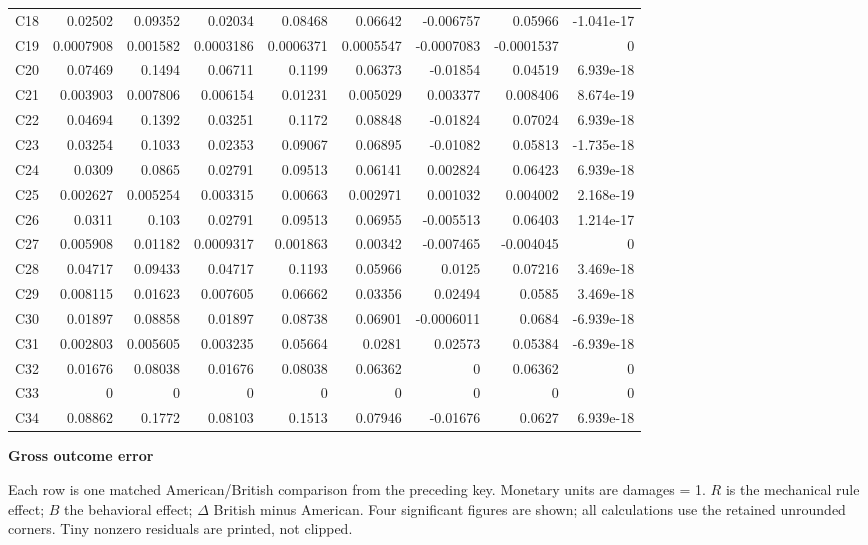\documentclass[10pt]{article}
\begin{document}
\begin{longtable}{@{}lrrrrrrrr@{}}
C18 & 0.02502 & 0.09352 & 0.02034 & 0.08468 & 0.06642 & -0.006757 & 0.05966 & -1.041e-17\\[1pt]
C19 & 0.0007908 & 0.001582 & 0.0003186 & 0.0006371 & 0.0005547 & -0.0007083 & -0.0001537 & 0\\[1pt]
C20 & 0.07469 & 0.1494 & 0.06711 & 0.1199 & 0.06373 & -0.01854 & 0.04519 & 6.939e-18\\[1pt]
C21 & 0.003903 & 0.007806 & 0.006154 & 0.01231 & 0.005029 & 0.003377 & 0.008406 & 8.674e-19\\[1pt]
C22 & 0.04694 & 0.1392 & 0.03251 & 0.1172 & 0.08848 & -0.01824 & 0.07024 & 6.939e-18\\[1pt]
C23 & 0.03254 & 0.1033 & 0.02353 & 0.09067 & 0.06895 & -0.01082 & 0.05813 & -1.735e-18\\[1pt]
C24 & 0.0309 & 0.0865 & 0.02791 & 0.09513 & 0.06141 & 0.002824 & 0.06423 & 6.939e-18\\[1pt]
C25 & 0.002627 & 0.005254 & 0.003315 & 0.00663 & 0.002971 & 0.001032 & 0.004002 & 2.168e-19\\[1pt]
C26 & 0.0311 & 0.103 & 0.02791 & 0.09513 & 0.06955 & -0.005513 & 0.06403 & 1.214e-17\\[1pt]
C27 & 0.005908 & 0.01182 & 0.0009317 & 0.001863 & 0.00342 & -0.007465 & -0.004045 & 0\\[1pt]
C28 & 0.04717 & 0.09433 & 0.04717 & 0.1193 & 0.05966 & 0.0125 & 0.07216 & 3.469e-18\\[1pt]
C29 & 0.008115 & 0.01623 & 0.007605 & 0.06662 & 0.03356 & 0.02494 & 0.0585 & 3.469e-18\\[1pt]
C30 & 0.01897 & 0.08858 & 0.01897 & 0.08738 & 0.06901 & -0.0006011 & 0.0684 & -6.939e-18\\[1pt]
C31 & 0.002803 & 0.005605 & 0.003235 & 0.05664 & 0.0281 & 0.02573 & 0.05384 & -6.939e-18\\[1pt]
C32 & 0.01676 & 0.08038 & 0.01676 & 0.08038 & 0.06362 & 0 & 0.06362 & 0\\[1pt]
C33 & 0 & 0 & 0 & 0 & 0 & 0 & 0 & 0\\[1pt]
C34 & 0.08862 & 0.1772 & 0.08103 & 0.1513 & 0.07946 & -0.01676 & 0.0627 & 6.939e-18\\[1pt]
\end{longtable}\normalsize
\newpage
{\LARGE\bfseries Gross outcome error}\par\medskip
Each row is one matched American/British comparison from the preceding key. Monetary units are damages = 1. $R$ is the mechanical rule effect; $B$ the behavioral effect; $\Delta$ British minus American. Four significant figures are shown; all calculations use the retained unrounded corners. Tiny nonzero residuals are printed, not clipped.\par\medskip
\end{document}
